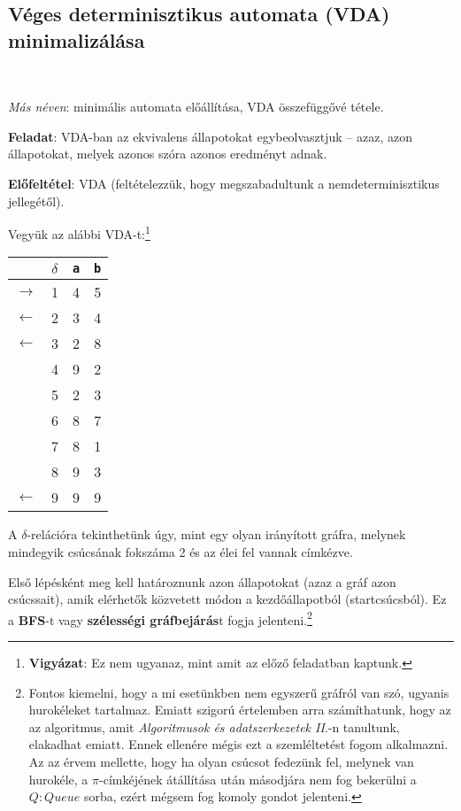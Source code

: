 \documentclass[a4paper,11pt]{article}
\begin{document}
\newpage

\subsection{Véges determinisztikus automata (VDA) minimalizálása}

~\\[-2em]

\begin{mdframed}
	\textit{Más néven}: minimális automata előállítása, VDA összefüggővé tétele.
	
	\textbf{Feladat}: VDA-ban az ekvivalens állapotokat egybeolvasztjuk -- azaz, azon állapotokat, melyek azonos szóra azonos eredményt adnak.
	
	\textbf{Előfeltétel}: VDA (feltételezzük, hogy megszabadultunk a nemdeterminisztikus jellegétől).
\end{mdframed}

Vegyük az alábbi VDA-t:\footnote{\textbf{Vigyázat}: Ez nem ugyanaz, mint amit az előző feladatban kaptunk.}

\begin{center}
	\setlength{\tabcolsep}{1em} %
	{\renewcommand{\arraystretch}{1.25}%
		\begin{tabular}{cc||c|c}
			& $\delta$ & \texttt{a} & \texttt{b} \\
			\hline
			$\rightarrow$ & 1 & 4 & 5 \\
			$\leftarrow$ & 2 & 3 & 4 \\
			$\leftarrow$ & 3 & 2 & 8 \\
			& 4 & 9 & 2 \\
			& 5 & 2 & 3 \\
			& 6 & 8 & 7 \\
			& 7 & 8 & 1 \\
			& 8 & 9 & 3 \\
			$\leftarrow$ & 9 & 9 & 9
		\end{tabular}
	}
\end{center}

A $\delta$-relációra tekinthetünk úgy, mint egy olyan irányított gráfra, melynek mindegyik csúcsának fokszáma 2 és az élei fel vannak címkézve. 

Első lépésként meg kell határoznunk azon állapotokat (azaz a gráf azon csúcssait), amik elérhetők közvetett módon a kezdőállapotból (startcsúcsból). Ez a \textbf{BFS}-t vagy \textbf{szélességi gráfbejárás}t fogja jelenteni.\footnote{Fontos kiemelni, hogy a mi esetünkben nem egyszerű gráfról van szó, ugyanis hurokéleket tartalmaz. Emiatt szigorú értelemben arra számíthatunk, hogy az az algoritmus, amit \textit{Algoritmusok és adatszerkezetek II}.-n tanultunk, elakadhat emiatt. Ennek ellenére mégis ezt a szemléltetést fogom alkalmazni. Az az érvem mellette, hogy ha olyan csúcsot fedezünk fel, melynek van hurokéle, a $\pi$-címkéjének átállítása után másodjára nem fog bekerülni a $Q:Queue$ sorba, ezért mégsem fog komoly gondot jelenteni.}
\end{document}
